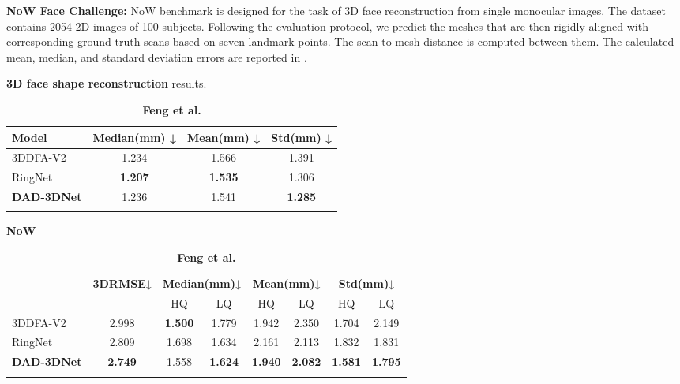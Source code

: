 \documentclass[10pt,twocolumn,letterpaper]{article}
\begin{document}
\textbf{NoW Face Challenge:} 
NoW benchmark is designed for the task of 3D face reconstruction from single monocular images. The dataset contains 2054 2D images of 100 subjects. Following the evaluation protocol, we predict the meshes that are then rigidly aligned with corresponding ground truth scans based on seven landmark points. The scan-to-mesh distance is computed between them. The calculated mean, median, and standard deviation errors are reported in .
\begin{table}[t]
\bigskip
\footnotesize
\caption{\textbf{3D face shape reconstruction} results. }
\setlength{\tabcolsep}{3pt}
	\begin{subtable}[t]{.99\linewidth}\centering
		{
\centering
\tiny
\begin{adjustbox}{width=0.99\textwidth}
\begin{tabular}{@{}lccc@{}}

\hline \textbf{Model} & \textbf{Median(mm)} ↓ & \textbf{Mean(mm)} ↓ & \textbf{Std(mm)} ↓ \\\hline 3DDFA-V2\cite{3ddfa_cleardusk, guo2020towards} & 1.234 & 1.566 & 1.391                          \\
    RingNet\cite{RingNet} & \textbf{1.207} & \textbf{1.535} & 1.306\\
    \textbf{DAD-3DNet} & 1.236 & 1.541 & \textbf{1.285}                        \\\hline
\noalign{\smallskip}
\end{tabular}
\end{adjustbox}
\caption{\textbf{NoW\cite{RingNet}}}
\label{t:3dshape_now} }	
	\end{subtable}
	\hfill
	\begin{subtable}[t]{.99\linewidth}\centering
		{\footnotesize
\begin{adjustbox}{width=0.99\textwidth}
\begin{tabular}{@{}lccccccc@{}}
\noalign{\smallskip}
\toprule \multirow{2}{*}{\textbf{Model}}& \multirow{2}{*}{\textbf{3DRMSE}↓} & 
    \multicolumn{2}{c}{\textbf{Median(mm)}↓} &
    \multicolumn{2}{c}{\textbf{Mean(mm)}↓} & 
    \multicolumn{2}{c}{\textbf{Std(mm)}↓} \\
             &       &   HQ  &   LQ  &   HQ  &   LQ  &   HQ  &   LQ  \\\toprule 3DDFA-V2\cite{3ddfa_cleardusk, guo2020towards} &   2.998 &   \textbf{1.500}  &   1.779  &   1.942   &  2.350    &   1.704  & 2.149  \\
    RingNet\cite{RingNet}  &   2.809   &   1.698   &   1.634   &   2.161  &   2.113    &  1.832   & 1.831  \\
    \textbf{DAD-3DNet} &   \textbf{2.749}   &   1.558   &   \textbf{1.624}   &   \textbf{1.940}   &   \textbf{2.082}   &   \textbf{1.581}   &   \textbf{1.795}   \\\bottomrule
\noalign{\smallskip}
\end{tabular}
\end{adjustbox}
\caption{\textbf{Feng et al.\cite{3d-face-modeling-from-diverse-raw-scan-data}}}
\label{t:3dshape_feng} }	
	\end{subtable}
\vspace{-2.0em}
\end{table}
 
\end{document}
